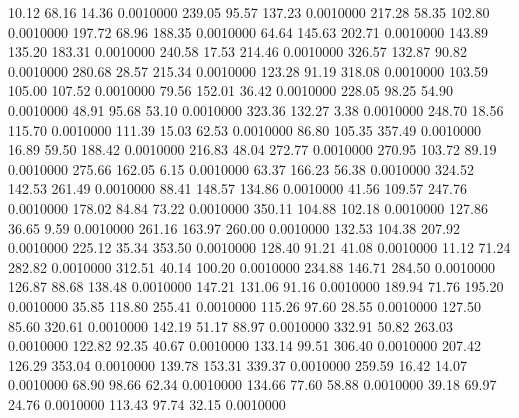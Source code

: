   10.12   68.16   14.36   0.0010000
 239.05   95.57  137.23   0.0010000
 217.28   58.35  102.80   0.0010000
 197.72   68.96  188.35   0.0010000
  64.64  145.63  202.71   0.0010000
 143.89  135.20  183.31   0.0010000
 240.58   17.53  214.46   0.0010000
 326.57  132.87   90.82   0.0010000
 280.68   28.57  215.34   0.0010000
 123.28   91.19  318.08   0.0010000
 103.59  105.00  107.52   0.0010000
  79.56  152.01   36.42   0.0010000
 228.05   98.25   54.90   0.0010000
  48.91   95.68   53.10   0.0010000
 323.36  132.27    3.38   0.0010000
 248.70   18.56  115.70   0.0010000
 111.39   15.03   62.53   0.0010000
  86.80  105.35  357.49   0.0010000
  16.89   59.50  188.42   0.0010000
 216.83   48.04  272.77   0.0010000
 270.95  103.72   89.19   0.0010000
 275.66  162.05    6.15   0.0010000
  63.37  166.23   56.38   0.0010000
 324.52  142.53  261.49   0.0010000
  88.41  148.57  134.86   0.0010000
  41.56  109.57  247.76   0.0010000
 178.02   84.84   73.22   0.0010000
 350.11  104.88  102.18   0.0010000
 127.86   36.65    9.59   0.0010000
 261.16  163.97  260.00   0.0010000
 132.53  104.38  207.92   0.0010000
 225.12   35.34  353.50   0.0010000
 128.40   91.21   41.08   0.0010000
  11.12   71.24  282.82   0.0010000
 312.51   40.14  100.20   0.0010000
 234.88  146.71  284.50   0.0010000
 126.87   88.68  138.48   0.0010000
 147.21  131.06   91.16   0.0010000
 189.94   71.76  195.20   0.0010000
  35.85  118.80  255.41   0.0010000
 115.26   97.60   28.55   0.0010000
 127.50   85.60  320.61   0.0010000
 142.19   51.17   88.97   0.0010000
 332.91   50.82  263.03   0.0010000
 122.82   92.35   40.67   0.0010000
 133.14   99.51  306.40   0.0010000
 207.42  126.29  353.04   0.0010000
 139.78  153.31  339.37   0.0010000
 259.59   16.42   14.07   0.0010000
  68.90   98.66   62.34   0.0010000
 134.66   77.60   58.88   0.0010000
  39.18   69.97   24.76   0.0010000
 113.43   97.74   32.15   0.0010000
